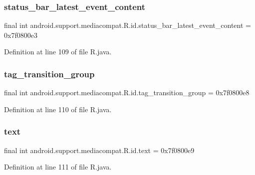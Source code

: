 \subsubsection{\texorpdfstring{status\_bar\_latest\_event\_content}{status\_bar\_latest\_event\_content}}
{\footnotesize\ttfamily final int android.\+support.\+mediacompat.\+R.\+id.\+status\+\_\+bar\+\_\+latest\+\_\+event\+\_\+content = 0x7f0800e3\hspace{0.3cm}{\ttfamily [static]}}



Definition at line 109 of file R.\+java.

\mbox{\label{classandroid_1_1support_1_1mediacompat_1_1_r_1_1id_a9bdc2a1b5e3044ae4478cdaf8ecdf1c5}} 
\subsubsection{\texorpdfstring{tag\_transition\_group}{tag\_transition\_group}}
{\footnotesize\ttfamily final int android.\+support.\+mediacompat.\+R.\+id.\+tag\+\_\+transition\+\_\+group = 0x7f0800e8\hspace{0.3cm}{\ttfamily [static]}}



Definition at line 110 of file R.\+java.

\mbox{\label{classandroid_1_1support_1_1mediacompat_1_1_r_1_1id_a27977888343c802d53fd8e31094c4d46}} 
\subsubsection{\texorpdfstring{text}{text}}
{\footnotesize\ttfamily final int android.\+support.\+mediacompat.\+R.\+id.\+text = 0x7f0800e9\hspace{0.3cm}{\ttfamily [static]}}



Definition at line 111 of file R.\+java.

